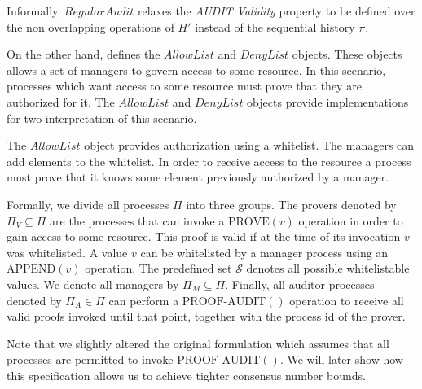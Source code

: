 \documentclass[11pt]{article}
\theoremstyle{definition}
\begin{document}
Informally, $RegularAudit$ relaxes the \textit{\mbox{AUDIT} Validity} property to be defined over the non overlapping operations of $H'$ instead of the sequential history $\pi$.

On the other hand, \cite{AccessControl} defines the $AllowList$ and $DenyList$ objects. These objects allows a set of managers to govern access to some resource. In this scenario, processes which want access to some resource must prove that they are authorized for it. The $AllowList$ and $DenyList$ objects provide implementations for two interpretation of this scenario. 

The $AllowList$ object provides authorization using a whitelist. The managers can add elements to the whitelist. In order to receive access to the resource a process must prove that it knows some element previously authorized by a manager.

Formally, we divide all processes  $\Pi$ into three groups. The provers denoted by $\Pi_V \subseteq \Pi$ are the processes that can invoke a $\mbox{PROVE}(v)$ operation in order to gain access to some resource. This proof is valid if at the time of its invocation $v$ was whitelisted. A value $v$ can be whitelisted by a manager process using an $\mbox{APPEND}(v)$ operation. The predefined set $\mathcal{S}$ denotes all possible whitelistable values. We denote all managers by $\Pi_M\subseteq \Pi$. Finally, all auditor processes denoted by $\Pi_A\in \Pi$ can perform a $\mbox{PROOF-AUDIT}()$ operation to receive all valid proofs invoked until that point, together with the process id of the prover. 

Note that we slightly altered the original formulation which assumes that all processes are permitted to invoke $\mbox{PROOF-AUDIT}()$. We will later show how this specification allows us to achieve tighter consensus number bounds.
\end{document}
